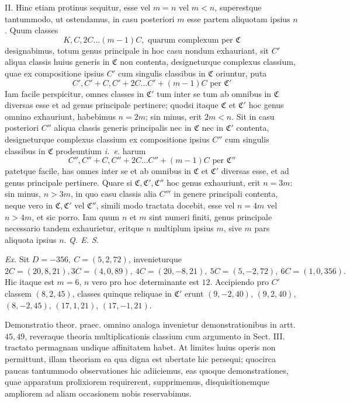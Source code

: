 II. Hinc etiam protinus sequitur, esse vel \(m=n\) vel \(m<n\), superestque tantummodo, ut ostendamus, in casu posteriori \(m\) esse partem aliquotam ipsius \(n\). Quum classes
\[K,C,2C\ldots(m-1)C,\text{ quarum complexum per }\mathfrak C\]
designabimus, totum genus principale in hoc casu nondum exhauriant, sit \(C'\) aliqua classis huius generis in \(\mathfrak C\) non contenta, designeturque complexus classium, quae ex compositione ipsius \(C'\) cum singulis classibus in \(\mathfrak C\) oriuntur, puta
\[C',C'+C,C'+2C\ldots C'+(m-1)C\text{ per }\mathfrak C'\]
Iam facile perspicitur, omnes classes in \(\mathfrak C'\) tum inter se tum ab omnibus in \(\mathfrak C\) diversas esse et ad genus principale pertinere; quodsi itaque \(\mathfrak C\) et \(\mathfrak C'\) hoc genus omnino exhauriunt, habebimus \(n=2m\); sin minus, erit \(2m<n\). Sit in casu posteriori \(C''\) aliqua classis generis principalis nec in \(\mathfrak C\) nec in \(\mathfrak C'\) contenta, designeturque complexus classium ex compositione ipsius \(C''\) cum singulis classibus in \(\mathfrak C\) prodeuntium \textit{i.~e.} harum
\[C'',C''+C,C''+2C\ldots C''+(m-1)C\text{ per }\mathfrak C''\]
patetque facile, has omnes inter se et ab omnibus in \(\mathfrak C\) et \(\mathfrak C'\) diversas esse, et ad genus principale pertinere. Quare si \(\mathfrak C,\mathfrak C',\mathfrak C''\) hoc genus exhauriunt, erit \(n=3m\): sin minus, \(n>3m\), in quo casu classis alia \(C'''\) in genere principali contenta, neque vero in \(\mathfrak C,\mathfrak C'\) vel \(\mathfrak C''\), simili modo tractata docebit, esse vel \(n=4m\) vel \(n>4m\), et sic porro. Iam quum \(n\) et \(m\) sint numeri finiti, genus principale necessario tandem exhaurietur, eritque \(n\) multiplum ipsius \(m\), sive \(m\) pars aliquota ipsius \(n\). \textit{Q. E. S.}

\textit{Ex.} Sit \(D=-356,\ C=(5,2,72)\), invenieturque \(2C=(20,8,21), 3C=(4,0,89),\ 4C=(20,-8,21),\ 5C=(5,-2,72),\ 6C=(1,0,356).\) Hic
itaque est \(m=6\), \(n\) vero pro hoc determinante est \(12\). Accipiendo pro \(C'\) classem \((8,2,45)\), classes quinque reliquae in \(\mathfrak C'\) erunt \((9,-2,40)\), \((9,2,40)\), \((8,-2,45)\), \((17,1,21)\), \((17,-1,21)\).

Demonstratio theor. praec. omnino analoga invenietur demonstrationibus in artt. \(45,49\), reveraque theoria multiplicationis classium cum argumento in Sect. III. tractato permagnam undique affinitatem habet. At limites huius operis non permittunt, illam theoriam ea qua digna est ubertate hic persequi; quocirca paucas tantummodo observationes hic adiiciemus, eas quoque demonstrationes, quae apparatum prolixiorem requirerent, supprimemus, disquisitionemque ampliorem ad aliam occasionem nobis reservabimus.


